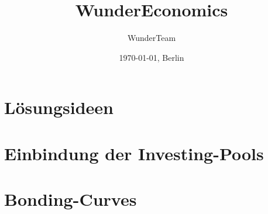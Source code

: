 \documentclass[11pt]{scrartcl}
\title{WunderEconomics}
\author{WunderTeam}
\date{\today{}, Berlin}
\begin{document}
\maketitle
\tableofcontents{}

\newpage





\section{Lösungsideen}
\vspace{0.3cm}
\section{Einbindung der Investing-Pools}
\vspace{0.3cm}
\section{Bonding-Curves}
\vspace{0.3cm}


 
\end{document}
